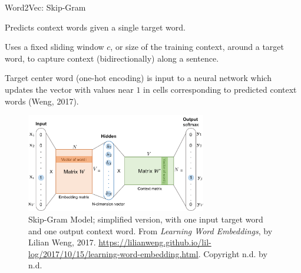 \begin{frame}{Word2Vec: Skip-Gram}\label{SkipGram}
    
    \begin{itemizeSpaced}{5pt}
        \pinkbox  Predicts context words given a single target word. 
        
        \pinkbox Uses a fixed sliding window $c$, or size of the training context, around a target word, to capture context (bidirectionally) along a sentence. 
        
        \item Target center word (one-hot encoding) is input to a neural network which updates the vector with values near $1$ in cells corresponding to predicted context words (Weng, 2017).  
        
    \end{itemizeSpaced}
    
    
    \begin{figure}[h]
    \vspace{-15pt}
    \centering
    \includegraphics[width=0.7\textwidth]{imgs/skipgram_image.png}
    \vspace{-5pt}
    \caption{\scriptsize Skip-Gram Model; simplified version, with one input target word and one output context word. From \emph{Learning Word Embeddings}, by Lilian Weng, 2017. \url{https://lilianweng.github.io/lil-log/2017/10/15/learning-word-embedding.html}. Copyright n.d. by n.d.}
    \label{fig:SkipGram}
    \vspace{-5pt}
    \end{figure}
    
\end{frame}


